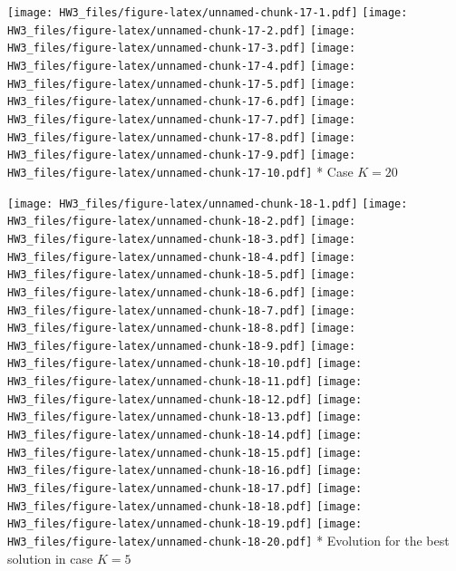 \documentclass[]{article}
\newenvironment{Shaded}{\begin{snugshade}}{\end{snugshade}}
\newcommand{\KeywordTok}[1]{\textcolor[rgb]{0.13,0.29,0.53}{\textbf{#1}}}
\newcommand{\DecValTok}[1]{\textcolor[rgb]{0.00,0.00,0.81}{#1}}
\newcommand{\ControlFlowTok}[1]{\textcolor[rgb]{0.13,0.29,0.53}{\textbf{#1}}}
\newcommand{\OperatorTok}[1]{\textcolor[rgb]{0.81,0.36,0.00}{\textbf{#1}}}
\newcommand{\NormalTok}[1]{#1}
\begin{document}
\texttt{[image: HW3\_files/figure-latex/unnamed-chunk-17-1.pdf]}
\texttt{[image: HW3\_files/figure-latex/unnamed-chunk-17-2.pdf]}
\texttt{[image: HW3\_files/figure-latex/unnamed-chunk-17-3.pdf]}
\texttt{[image: HW3\_files/figure-latex/unnamed-chunk-17-4.pdf]}
\texttt{[image: HW3\_files/figure-latex/unnamed-chunk-17-5.pdf]}
\texttt{[image: HW3\_files/figure-latex/unnamed-chunk-17-6.pdf]}
\texttt{[image: HW3\_files/figure-latex/unnamed-chunk-17-7.pdf]}
\texttt{[image: HW3\_files/figure-latex/unnamed-chunk-17-8.pdf]}
\texttt{[image: HW3\_files/figure-latex/unnamed-chunk-17-9.pdf]}
\texttt{[image: HW3\_files/figure-latex/unnamed-chunk-17-10.pdf]} * Case
\(K = 20\)

\begin{Shaded}
\end{Shaded}

\texttt{[image: HW3\_files/figure-latex/unnamed-chunk-18-1.pdf]}
\texttt{[image: HW3\_files/figure-latex/unnamed-chunk-18-2.pdf]}
\texttt{[image: HW3\_files/figure-latex/unnamed-chunk-18-3.pdf]}
\texttt{[image: HW3\_files/figure-latex/unnamed-chunk-18-4.pdf]}
\texttt{[image: HW3\_files/figure-latex/unnamed-chunk-18-5.pdf]}
\texttt{[image: HW3\_files/figure-latex/unnamed-chunk-18-6.pdf]}
\texttt{[image: HW3\_files/figure-latex/unnamed-chunk-18-7.pdf]}
\texttt{[image: HW3\_files/figure-latex/unnamed-chunk-18-8.pdf]}
\texttt{[image: HW3\_files/figure-latex/unnamed-chunk-18-9.pdf]}
\texttt{[image: HW3\_files/figure-latex/unnamed-chunk-18-10.pdf]}
\texttt{[image: HW3\_files/figure-latex/unnamed-chunk-18-11.pdf]}
\texttt{[image: HW3\_files/figure-latex/unnamed-chunk-18-12.pdf]}
\texttt{[image: HW3\_files/figure-latex/unnamed-chunk-18-13.pdf]}
\texttt{[image: HW3\_files/figure-latex/unnamed-chunk-18-14.pdf]}
\texttt{[image: HW3\_files/figure-latex/unnamed-chunk-18-15.pdf]}
\texttt{[image: HW3\_files/figure-latex/unnamed-chunk-18-16.pdf]}
\texttt{[image: HW3\_files/figure-latex/unnamed-chunk-18-17.pdf]}
\texttt{[image: HW3\_files/figure-latex/unnamed-chunk-18-18.pdf]}
\texttt{[image: HW3\_files/figure-latex/unnamed-chunk-18-19.pdf]}
\texttt{[image: HW3\_files/figure-latex/unnamed-chunk-18-20.pdf]} *
Evolution for the best solution in case \(K = 5\)
\end{document}

